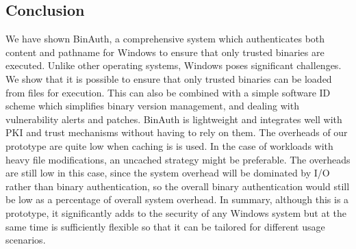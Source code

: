 \subsection{Conclusion}
\label{sec:binauth-conc}

We have shown BinAuth, a comprehensive system which authenticates both content and pathname
for Windows to ensure that only trusted binaries are executed. 
Unlike other operating systems, Windows poses significant challenges.
We show that it is possible to ensure that only trusted binaries can be loaded
from files for execution. 
This can also be combined with a simple software ID
scheme which simplifies binary version management, and dealing
with vulnerability alerts and patches.
BinAuth is lightweight and integrates well with PKI and 
trust mechanisms without
having to rely on them.
The overheads of our prototype are quite low when caching is is used.
In the case of workloads with heavy file modifications, an uncached strategy might be preferable.
The overheads are still low in this case, since the system overhead
will be dominated by I/O rather than binary authentication,
so the overall binary authentication
would still be low as a percentage of overall system overhead. 
In summary, although this is a prototype, it significantly adds
to the security of any Windows system but at the same time is sufficiently
flexible so that it can be tailored for different usage scenarios.


